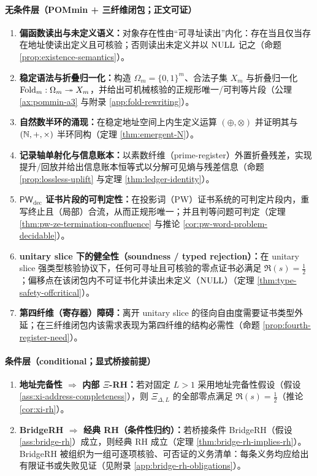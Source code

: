 \paragraph{无条件层（POMmin + 三纤维闭包；正文可证）}
\begin{enumerate}
  \item \textbf{偏函数读出与未定义语义：}对象存在性由“可寻址读出”内化：存在当且仅当存在地址使读出定义且可核验；否则读出未定义并以 $\mathrm{NULL}$ 记之（命题 \ref{prop:existence-semantics}）。
  \item \textbf{稳定语法与折叠归一化：}构造 $\Omega_m=\{0,1\}^m$、合法子集 $X_m$ 与折叠归一化 $\mathrm{Fold}_m:\Omega_m\twoheadrightarrow X_m$，并给出可机械核验的正规形唯一/可判等片段（公理 \ref{ax:pommin-a3} 与附录 \ref{app:fold-rewriting}）。
  \item \textbf{自然数半环的涌现：}在稳定地址空间上内生定义运算 $(\oplus,\otimes)$ 并证明其与 $(\mathbb{N},+,\times)$ 半环同构（定理 \ref{thm:emergent-N}）。
  \item \textbf{记录轴单射化与信息账本：}以素数纤维（prime-register）外置折叠残差，实现提升/回放并给出信息账本恒等式以分解可见熵与残差信息（命题 \ref{prop:lossless-uplift} 与定理 \ref{thm:ledger-identity}）。
  \item \textbf{$\mathsf{PW}_{\mathrm{dec}}$ 证书片段的可判定性：}在投影词（PW）证书系统的可判定片段内，重写终止且（局部）合流，从而正规形唯一；并且判等问题可判定（定理 \ref{thm:pw-ze-termination-confluence} 与推论 \ref{cor:pw-word-problem-decidable}）。
  \item \textbf{unitary slice 下的健全性（soundness / typed rejection）：}在 unitary slice 强类型核验协议下，任何可寻址且可核验的零点证书必满足 $\Re(s)=\tfrac12$；偏移点在该闭包内不可证书化并读出未定义（$\mathrm{NULL}$）（定理 \ref{thm:type-safety-offcritical}）。
  \item \textbf{第四纤维（寄存器）障碍：}离开 unitary slice 的径向自由度需要证书类型外延；在三纤维闭包内该需求表现为第四纤维的结构必需性（命题 \ref{prop:fourth-register-need}）。
\end{enumerate}

\paragraph{条件层（conditional；显式桥接前提）}
\begin{enumerate}
  \item \textbf{地址完备性 $\Rightarrow$ 内部 $\Xi$-RH：}若对固定 $L>1$ 采用地址完备性假设（假设 \ref{ass:xi-address-completeness}），则 $\Xi_{\Delta,L}$ 的全部零点满足 $\Re(s)=\tfrac12$（推论 \ref{cor:xi-rh}）。
  \item \textbf{BridgeRH $\Rightarrow$ 经典 RH（条件性归约）：}若桥接条件 BridgeRH（假设 \ref{ass:bridge-rh}）成立，则经典 RH 成立（定理 \ref{thm:bridge-rh-implies-rh}）。BridgeRH 被组织为一组可逐项核验、可否证的义务清单：每条义务均应给出有限证书或失败见证（见附录 \ref{app:bridge-rh-obligations}）。
\end{enumerate}


